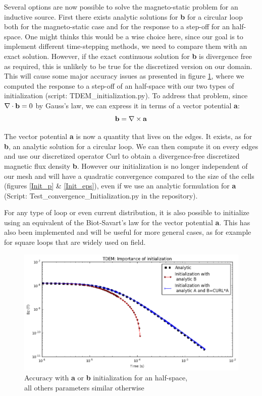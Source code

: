 \documentclass[twoside]{article}
\begin{document}
Several options are now possible to solve the magneto-static problem for an inductive source. First there exists analytic solutions for \textbf{b} for a circular loop both for the magneto-static case and for the response to a step-off for an half-space. One might thinks this would be a wise choice here, since our goal is to implement different time-stepping methods, we need to compare them with an exact solution. However, if the exact continuous solution for \textbf{b} is divergence free as required, this is unlikely to be true for the discretized version on our domain. This will cause some major accuracy issues as presented in figure \ref{Convergence_Initialisation}, where we computed the response to a step-off of an half-space with our two types of initialization (script: TDEM\_initialization.py). To address that problem, since $\nabla \cdot {\bf b}=0$ by Gauss's law, we can express it in terms of a vector potential \textbf{a}:
\begin{equation}
{\bf b}= \nabla \times {\bf a}
\end{equation} 

The vector potential \textbf{a} is now a quantity that lives on the edges. It exists, as for \textbf{b}, an analytic solution for a circular loop. We can then compute it on every edges and use our discretized operator Curl to obtain a divergence-free discretized magnetic flux density \textbf{b}. However our initialization is no longer independent of our mesh and will have a quadratic convergence compared to the size of the cells (figures \ref{Init_p} \& \ref{Init_eps}), even if we use an analytic formulation for \textbf{a} (Script: Test\_convergence\_Initialization.py in the repository).

For any type of loop or even current distribution, it is also possible to initialize using an equivalent of the Biot-Savart's law for the vector potential \textbf{a}. This has also been implemented and will be useful for more general cases, as for example for square loops that are widely used on field.


\begin{figure}[!ht]
\centering
\includegraphics[scale=0.4]{./figures/initialisation/Initialization.png}
\caption{Accuracy with \textbf{a} or \textbf{b} initialization for an half-space,\\ all others parameters similar otherwise}
\label{Convergence_Initialisation}
\end{figure}
\end{document}
